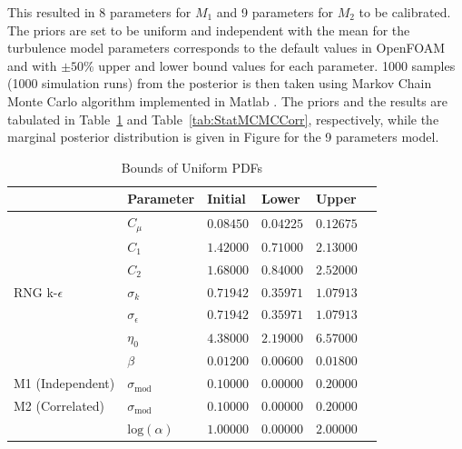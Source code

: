 \documentclass[11pt,titlepage]{article}
\begin{document}
This resulted in 8 parameters for $M_1$ and 9 parameters for $M_2$ to be calibrated. The priors are set to be uniform and independent with the mean for the turbulence model parameters corresponds to the default values in OpenFOAM and with $\pm50\%$ upper and lower bound values for each parameter. 1000 samples (1000 simulation runs) from the posterior is then taken using Markov Chain Monte Carlo algorithm implemented in Matlab \cite{Haario2006}. The priors and the results are tabulated in Table~\ref{tab:BoundsOfUniformPDFs} and Table~\ref{tab:StatMCMCCorr}, respectively, while the marginal posterior distribution is given in Figure for the 9 parameters model.
\begin{table}[htbp]
	\centering
		\caption{Bounds of Uniform PDFs}
		\begin{tabular}{l l l l l l}
			\hline \hline
												&	Parameter										& Initial 	& Lower			& Upper 		\\
			\hline
												& $C_\mu$											& $0.08450$ & $0.04225$ & $0.12675$ \\
												& $C_1$												& $1.42000$ & $0.71000$ & $2.13000$ \\
										  	& $C_2$												& $1.68000$ & $0.84000$ & $2.52000$ \\
			RNG k-$\epsilon$ 	& $\sigma_k$									& $0.71942$ & $0.35971$ & $1.07913$ \\
										  	& $\sigma_\epsilon$					  & $0.71942$ & $0.35971$ & $1.07913$ \\
										  	& $\eta_0$										& $4.38000$ & $2.19000$ & $6.57000$ \\
										  	& $\beta$							   			& $0.01200$ & $0.00600$ & $0.01800$ \\
			M1 (Independent)	& $\sigma_{\text{mod}}$				& $0.10000$ & $0.00000$ & $0.20000$ \\
			M2 (Correlated)		& $\sigma_{\text{mod}}$				& $0.10000$ & $0.00000$ & $0.20000$ \\
										  	& $\text{log}(\alpha)$				& $1.00000$ & $0.00000$ & $2.00000$ \\
			\hline
		\end{tabular}
	\label{tab:BoundsOfUniformPDFs}
\end{table}
\end{document}
